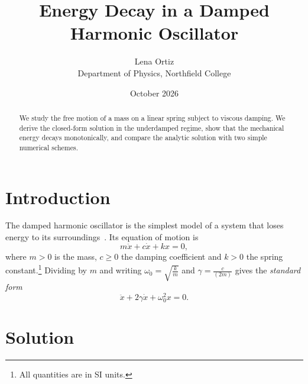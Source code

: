 \documentclass[11pt,a4paper]{article}
\title{Energy Decay in a Damped Harmonic Oscillator}
\author{Lena Ortiz\\ \small Department of Physics, Northfield College}
\date{October 2026}
\begin{document}
\maketitle

\begin{abstract}
We study the free motion of a mass on a linear spring subject to viscous damping. We derive the closed-form solution in the underdamped regime, show that the mechanical energy decays monotonically, and compare the analytic solution with two simple numerical schemes.
\end{abstract}

\section{Introduction}\label{sec:intro}

The damped harmonic oscillator is the simplest model of a system that loses energy to its surroundings~\cite{ref2}. Its equation of motion is
\begin{equation}
  m\ddot{x}+c\dot{x}+kx=0,
  \label{eq:1}
\end{equation}
where $m>0$ is the mass, $c\geq0$ the damping coefficient and $k>0$ the spring constant.\footnote{All quantities are in SI units.} Dividing by $m$ and writing $\omega_{0}=\sqrt{\frac{k}{m}}$ and $\gamma=\frac{c}{(2m)}$ gives the \emph{standard form}
\begin{equation}
  \ddot{x}+2\gamma\dot{x}+\omega_{0}^{2}x=0.
  \label{eq:2}
\end{equation}

\section{Solution}\label{sec:method}
\end{document}
